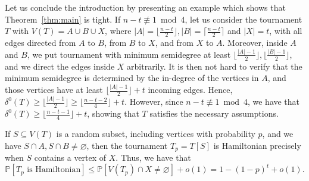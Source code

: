 \documentclass[a4paper,11pt]{article}
\theoremstyle{definition}
\def\Pb{\mathbb{P}}
\begin{document}
\medskip

Let us conclude the introduction by presenting an example which shows that Theorem~\ref{thm:main} is tight. If $n-t\not\equiv 1\bmod 4$, let us consider the tournament $T$ with $V(T)=A\cup B\cup X$, where $|A|=\lfloor \frac{n-t}{2}\rfloor, |B|=\lceil \frac{n-t}{2}\rceil$ and $|X|=t$, with all edges directed from $A$ to $B$, from $B$ to $X$, and from $X$ to $A$. Moreover, inside $A$ and $B$, we put tournament with minimum semidegree at least $\lfloor \frac{|A|-1}{2}\rfloor, \lfloor \frac{|B|-1}{2}\rfloor$, and we direct the edges inside $X$ arbitrarily. It is then not hard to verify that the minimum semidegree is determined by the in-degree of the vertices in $A$, and those vertices have at least $\lfloor \frac{|A|-1}{2}\rfloor+t$ incoming edges. Hence, $\delta^0(T)\geq \lfloor \frac{|A|-1}{2}\rfloor\geq \lfloor\frac{n-t-2}{4}\rfloor+t$. However, since $n-t\not\equiv 1\bmod 4$, we have that $\delta^0(T)\geq \lfloor\frac{n-t-1}{4}\rfloor+t$, showing that $T$ satisfies the necessary assumptions.

If $S\subseteq V(T)$ is a random subset, including vertices with probability $p$, and we have $S\cap A, S\cap B\neq \varnothing$, then the tournament $T_p=T[S]$ is Hamiltonian precisely when $S$ contains a vertex of $X$. Thus, we have that \[\Pb[T_p\text{ is Hamiltonian}]\leq \Pb[V(T_p)\cap X\neq \varnothing]+o(1)=1-(1-p)^{t}+o(1).\]
\end{document}
